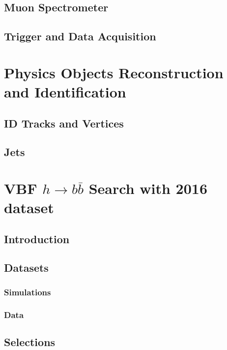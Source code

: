 \documentclass{report}
\begin{document}
\section{Muon Spectrometer}


\section{Trigger and Data Acquisition}


\chapter{Physics Objects Reconstruction and Identification}
\label{chap:reconstruction}


\section{ID Tracks and Vertices}


\section{Jets}

\clearpage

\chapter{VBF $h\rightarrow b\bar{b}$ Search with 2016 dataset}
\label{chap:vbf}
\section{Introduction}

\clearpage

\section{Datasets}
\subsection{Simulations}

\subsection{Data}

\clearpage

\section{Selections}
\end{document}

